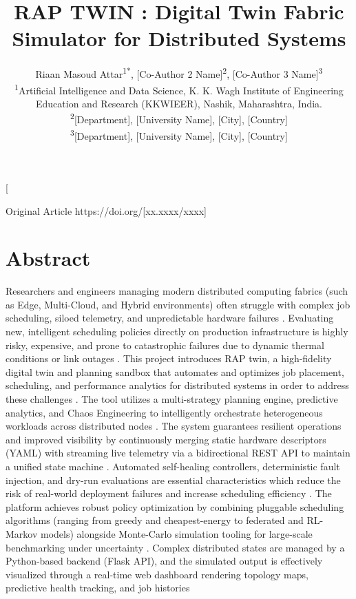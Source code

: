 \documentclass[twoside,twocolumn,10pt]{article}
\title{\fontsize{16}{20}\selectfont\textbf{RAP TWIN : Digital Twin Fabric Simulator for Distributed Systems}}
\author{
    \fontsize{12}{14}\selectfont
    Riaan Masoud Attar\textsuperscript{1*}, [Co-Author 2 Name]\textsuperscript{2}, [Co-Author 3 Name]\textsuperscript{3}\\[1ex]
    \fontsize{10}{12}\selectfont
    \textsuperscript{1}Artificial Intelligence and Data Science, K. K. Wagh Institute of Engineering Education and Research (KKWIEER), Nashik, Maharashtra, India.\\
    \textsuperscript{2}[Department], [University Name], [City], [Country]\\
    \textsuperscript{3}[Department], [University Name], [City], [Country]
}
\date{}
\begin{document}
\twocolumn[
\begin{@twocolumnfalse}

\vspace{-0.7cm}
{\noindent\raggedright
{\fontsize{11}{13}\selectfont Original Article}
\hfill
{\fontsize{11}{13}\selectfont\footnotesize https://doi.org/[xx.xxxx/xxxx]}
\par}

\vspace{-0.5cm}

\maketitle
\thispagestyle{firstpage}

\section*{\hspace{-1.5mm}Abstract}
\fontsize{10}{12}\selectfont
\justifying
\noindent
Researchers and engineers managing modern distributed computing fabrics (such as Edge, Multi-Cloud, and Hybrid environments) often struggle with complex job scheduling, siloed telemetry, and unpredictable hardware failures
. Evaluating new, intelligent scheduling policies directly on production infrastructure is highly risky, expensive, and prone to catastrophic failures due to dynamic thermal conditions or link outages
. This project introduces RAP twin, a high-fidelity digital twin and planning sandbox that automates and optimizes job placement, scheduling, and performance analytics for distributed systems in order to address these challenges
. The tool utilizes a multi-strategy planning engine, predictive analytics, and Chaos Engineering to intelligently orchestrate heterogeneous workloads across distributed nodes
. The system guarantees resilient operations and improved visibility by continuously merging static hardware descriptors (YAML) with streaming live telemetry via a bidirectional REST API to maintain a unified state machine
. Automated self-healing controllers, deterministic fault injection, and dry-run evaluations are essential characteristics which reduce the risk of real-world deployment failures and increase scheduling efficiency
. The platform achieves robust policy optimization by combining pluggable scheduling algorithms (ranging from greedy and cheapest-energy to federated and RL-Markov models) alongside Monte-Carlo simulation tooling for large-scale benchmarking under uncertainty
. Complex distributed states are managed by a Python-based backend (Flask API), and the simulated output is effectively visualized through a real-time web dashboard rendering topology maps, predictive health tracking, and job histories

\end{@twocolumnfalse}
\end{document}
